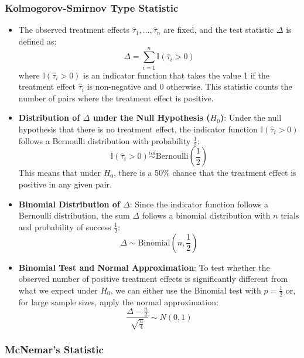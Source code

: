 \subsubsection{Kolmogorov-Smirnov Type Statistic}

\begin{itemize}
    
    \item The observed treatment effects $\hat{\tau}_1, \dots, \hat{\tau}_n$ are fixed, and the test statistic $\Delta$ is defined as:
    \[
    \Delta = \sum_{i=1}^{n} \mathbb{I} \left( \hat{\tau}_i > 0 \right)
    \]
    where $\mathbb{I} \left( \hat{\tau}_i > 0 \right)$ is an indicator function that takes the value 1 if the treatment effect $\hat{\tau}_i$ is non-negative and 0 otherwise. This statistic counts the number of pairs where the treatment effect is positive.
    
    \item \textbf{Distribution of $\Delta$ under the Null Hypothesis ($H_0$)}: 
    Under the null hypothesis that there is no treatment effect, the indicator function $\mathbb{I} \left( \hat{\tau}_i > 0 \right)$ follows a Bernoulli distribution with probability $\frac{1}{2}$:
    \[
    \mathbb{I} \left( \hat{\tau}_i > 0 \right) \overset{iid}{\sim} \text{Bernoulli}\left( \frac{1}{2} \right)
    \]
    This means that under $H_0$, there is a 50\% chance that the treatment effect is positive in any given pair.

    \item \textbf{Binomial Distribution of $\Delta$}: Since the indicator function follows a Bernoulli distribution, the sum $\Delta$ follows a binomial distribution with $n$ trials and probability of success $\frac{1}{2}$:
    \[
    \Delta \sim \text{Binomial}(n, \frac{1}{2})
    \]
    
    \item \textbf{Binomial Test and Normal Approximation}: To test whether the observed number of positive treatment effects is significantly different from what we expect under $H_0$, we can either use the Binomial test with $p = \frac{1}{2}$ or, for large sample sizes, apply the normal approximation:
    \[
    \frac{\Delta - \frac{n}{2}}{\sqrt{\frac{n}{4}}} \sim N(0, 1)
    \]
    
\end{itemize}

\subsubsection{McNemar's Statistic}

